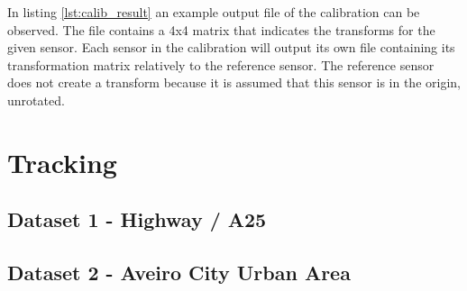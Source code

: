 In listing \ref{lst:calib_result} an example output file of the calibration can be observed. The file contains a 4x4 matrix that indicates the transforms for the given sensor. Each sensor in the calibration will output its own file containing its transformation matrix relatively to the reference sensor. The reference sensor does not create a transform because it is assumed that this sensor is in the origin, unrotated. 

\section{Tracking}
\subsection{Dataset 1 - Highway / A25}
\subsection{Dataset 2 - Aveiro City Urban Area}